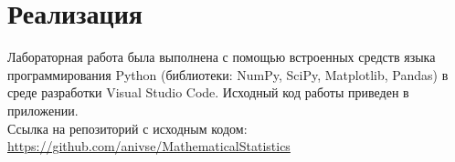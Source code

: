 \section{Реализация}

Лабораторная работа была выполнена с помощью встроенных средств языка программирования Python (библиотеки: NumPy, SciPy, Matplotlib, Pandas) в среде разработки Visual Studio Code. Исходный код работы приведен в приложении.\\

Ссылка на репозиторий с исходным кодом: \url{https://github.com/anivse/MathematicalStatistics}

